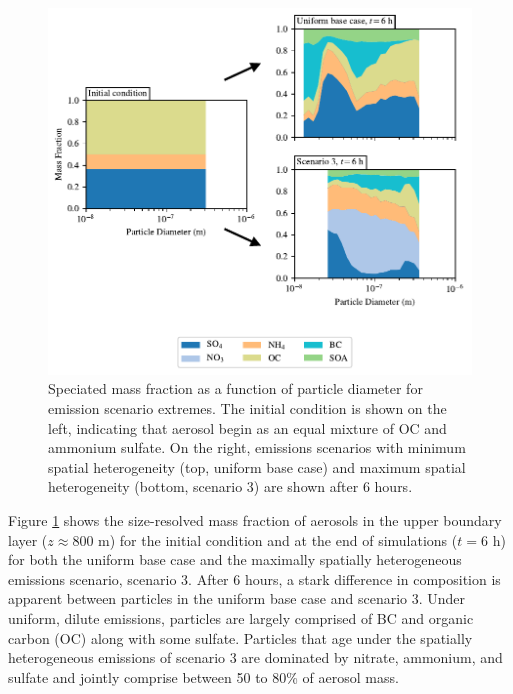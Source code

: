 \documentclass[journal abbreviation, manuscript]{copernicus}
\begin{document}
\begin{figure}[!h]
	\centering
	\includegraphics[]{figures/speciated-mass-frac-three-panel-z40.pdf}
	\caption{Speciated mass fraction as a function of particle diameter for emission scenario extremes. The initial condition is shown on the left, indicating that aerosol begin as an equal mixture of OC and ammonium sulfate. On the right, emissions scenarios with minimum spatial heterogeneity (top, uniform base case) and maximum spatial heterogeneity (bottom, scenario 3) are shown after 6 hours.}
	\label{fig:speciated-mass-frac}
\end{figure} 

Figure \ref{fig:speciated-mass-frac} shows the size-resolved mass fraction of aerosols in the upper boundary layer ($z\approx 800$ m) for the initial condition and at the end of simulations ($t=6$ h) for both the uniform base case and the maximally spatially heterogeneous emissions scenario, scenario 3. After 6 hours, a stark difference in composition is apparent between particles in the uniform base case and scenario 3. Under uniform, dilute emissions, particles are largely comprised of BC and organic carbon (OC) along with some sulfate. Particles that age under the spatially heterogeneous emissions of scenario 3 are dominated by nitrate, ammonium, and sulfate and jointly comprise between 50 to 80\% of aerosol mass. 
\end{document}
